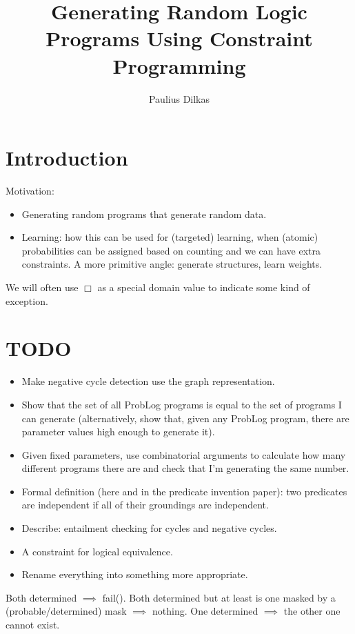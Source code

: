 \documentclass{article}
\author{Paulius Dilkas}
\title{Generating Random Logic Programs Using Constraint Programming}
\theoremstyle{definition}
\begin{document}
\maketitle

\section{Introduction}

Motivation:
\begin{itemize}
\item Generating random programs that generate random data.
\item Learning: how this can be used for (targeted) learning, when (atomic)
  probabilities can be assigned based on counting and we can have extra
  constraints. A more primitive angle: generate structures, learn weights.
\end{itemize}

We will often use $\Box$ as a special domain value to indicate some kind of
exception.

\section{TODO}

\begin{itemize}
\item Make negative cycle detection use the graph representation.
\item Show that the set of all ProbLog programs is equal to the set of programs
  I can generate (alternatively, show that, given any ProbLog program, there are
  parameter values high enough to generate it).
\item Given fixed parameters, use combinatorial arguments to calculate how many
  different programs there are and check that I'm generating the same number.
\item Formal definition (here and in the predicate invention paper): two
  predicates are independent if all of their groundings are independent.
\item Describe: entailment checking for cycles and negative cycles.
\item A constraint for logical equivalence.
\item Rename everything into something more appropriate.
\end{itemize}

Both determined $\implies$ fail(). Both determined but at least is one masked by
a (probable/determined) mask $\implies$ nothing. One determined $\implies$ the
other one cannot exist.
\end{document}
